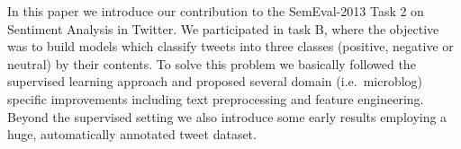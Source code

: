 In this paper we introduce our contribution to the SemEval-2013 Task 2 on Sentiment Analysis in Twitter. We participated in task B, where the objective
 was to build models which classify tweets into three classes (positive,
 negative or neutral) by their contents. To solve this problem we basically
 followed the supervised learning approach and proposed several domain
 (i.e.~microblog) specific improvements including text preprocessing and feature
 engineering. Beyond the supervised setting we also introduce some early results
 employing a huge, automatically annotated tweet dataset.

